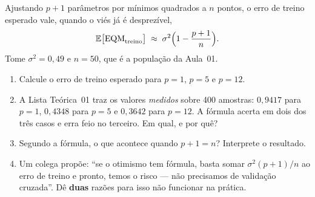 \documentclass[11pt,a4paper]{article}
\begin{document}

\begin{exercicio}
Ajustando $p+1$ parâmetros por mínimos quadrados a $n$ pontos, o erro de treino
esperado vale, quando o viés já é desprezível,
\[
  \mathbb{E}\big[\mathrm{EQM}_{\text{treino}}\big]
  \;\approx\; \sigma^2\Big(1-\frac{p+1}{n}\Big).
\]
Tome $\sigma^2=0{,}49$ e $n=50$, que é a população da Aula~01.
\begin{enumerate}[label=(\alph*),leftmargin=1.1cm]
  \item Calcule o erro de treino esperado para $p=1$, $p=5$ e $p=12$.
  \item A Lista Teórica~01 traz os valores \emph{medidos} sobre 400 amostras:
        $0{,}9417$ para $p=1$, $0{,}4348$ para $p=5$ e $0{,}3642$ para $p=12$.
        A fórmula acerta em dois dos três casos e erra feio no terceiro. Em qual,
        e por quê?
  \item Segundo a fórmula, o que acontece quando $p+1=n$? Interprete o resultado.
  \item Um colega propõe: ``se o otimismo tem fórmula, basta somar
        $\sigma^2(p+1)/n$ ao erro de treino e pronto, temos o risco --- não
        precisamos de validação cruzada''. Dê \textbf{duas} razões para isso não
        funcionar na prática.
\end{enumerate}
\end{exercicio}
\end{document}
